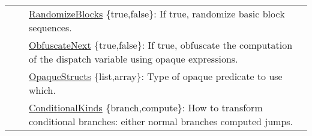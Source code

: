 \begin{table*}[!hp]
\begin{tabular}{|p{2.25cm}|p{4cm}|p{11cm}|}
                                     &                                                                                                                                                                                                                                                                                                         & \underline{RandomizeBlocks} \{true,false\}: If true, randomize  basic block sequences.                                                                                                                                                                                                                                                                 \\ \cline{3-3} 
                                     &                                                                                                                                                                                                                                                                                                         & \underline{ObfuscateNext} \{true,false\}: If true, obfuscate the computation of the dispatch variable using opaque expressions.                                                                                                                                                                                                                                        \\ \cline{3-3} 
                                     &                                                                                                                                                                                                                                                                                                         & \underline{OpaqueStructs} \{list,array\}: Type of opaque predicate to use which.                                                                                                                                                                                                                                                       \\ \cline{3-3} 
                                     &                                                                                                                                                                                                                                                                                                         & \underline{ConditionalKinds} \{branch,compute\}: How to transform conditional branches: either normal branches computed jumps.                                                                                                                                                                                                          \\ \hline

\end{tabular}
\end{table*}
